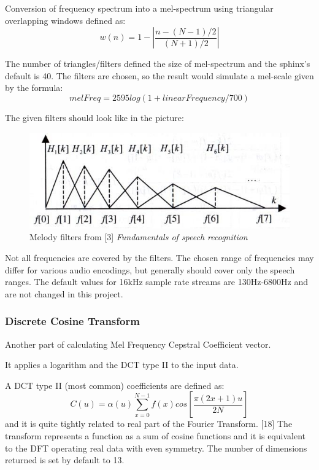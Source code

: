 \documentclass[12pt,a4paper,english]{article}
\begin{document}
Conversion of frequency spectrum into a mel-spectrum using triangular overlapping windows defined as:
\begin{equation}
    w(n) = 1 - |\frac{n - (N - 1)/2}{(N + 1)/2}|
\end{equation}


The number of triangles/filters defined the size of mel-spectrum and the sphinx's default is 40. \newline
The filters are chosen, so the result would simulate a mel-scale given by the formula:
\begin{equation}
    melFreq = 2595 log(1 + linearFrequency / 700)
\end{equation}

The given filters should look like in the picture:
\begin{figure}[hb]
    \centering
    \includegraphics[scale=0.4]{mel_filters.jpg}
    \caption[]{Melody filters from [3] \emph{Fundamentals of speech recognition}}
\end{figure}

Not all frequencies are covered by the filters.
The chosen range of frequencies may differ for various audio encodings,
but generally should cover only the speech ranges.
The default values for 16kHz sample rate streams are 130Hz-6800Hz and are not changed in this project.

\newpage
\subsubsection{Discrete Cosine Transform}

Another part of calculating Mel Frequency Cepstral Coefficient vector.  \newline

It applies a logarithm and the DCT type II to the input data.  \newline

A DCT type II (most common) coefficients are defined as: 
\begin{equation}
    C(u) = \alpha(u)\sum_{x=0}^{N-1} f(x)cos[\frac{\pi(2x+1)u}{2N}] 
\end{equation}
and it is quite tightly related to real part of the Fourier Transform. [18]
The transform represents a function as a sum of cosine functions and it is equivalent to the DFT operating
real data with even symmetry. \newline
The number of dimensions returned is set by default to 13.
\end{document}
